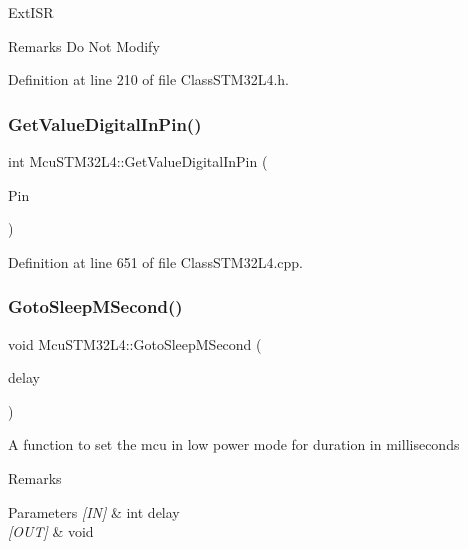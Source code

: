 Ext\+I\+SR \begin{DoxyRemark}{Remarks}
Do Not Modify 
\end{DoxyRemark}


Definition at line 210 of file Class\+S\+T\+M32\+L4.\+h.

\mbox{\label{class_mcu_s_t_m32_l4_aa53ed559e38c36adb88ecd5cfbf138b6}} 
\subsubsection{\texorpdfstring{Get\+Value\+Digital\+In\+Pin()}{GetValueDigitalInPin()}}
{\footnotesize\ttfamily int Mcu\+S\+T\+M32\+L4\+::\+Get\+Value\+Digital\+In\+Pin (\begin{DoxyParamCaption}\item[{\mbox{\hyperlink{_class_s_t_m32_l0_8h_a5ceb873075d76667eb54dc6a7d2734d1}{Pin\+Name}}}]{Pin }\end{DoxyParamCaption})}



Definition at line 651 of file Class\+S\+T\+M32\+L4.\+cpp.

\mbox{\label{class_mcu_s_t_m32_l4_a69544c445e1ba98745aa2ee356cb3aea}} 
\subsubsection{\texorpdfstring{Goto\+Sleep\+M\+Second()}{GotoSleepMSecond()}}
{\footnotesize\ttfamily void Mcu\+S\+T\+M32\+L4\+::\+Goto\+Sleep\+M\+Second (\begin{DoxyParamCaption}\item[{int}]{delay }\end{DoxyParamCaption})}

A function to set the mcu in low power mode for duration in milliseconds \begin{DoxyRemark}{Remarks}

\end{DoxyRemark}

\begin{DoxyParams}{Parameters}
{\em \mbox{[}\+I\+N\mbox{]}} & int delay \\
\hline
{\em \mbox{[}\+O\+U\+T\mbox{]}} & void \\
\hline
\end{DoxyParams}


